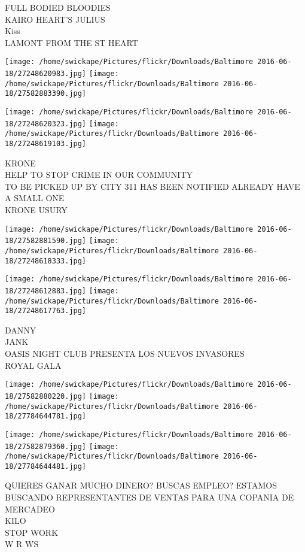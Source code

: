 \documentclass[10pt,letterpaper]{article}
\begin{document}
FULL BODIED BLOODIES\\
KAIRO HEART'S JULIUS\\
Kiss\\
LAMONT FROM THE ST HEART\\
\pagebreak

\texttt{[image: /home/swickape/Pictures/flickr/Downloads/Baltimore 2016-06-18/27248620983.jpg]}
\texttt{[image: /home/swickape/Pictures/flickr/Downloads/Baltimore 2016-06-18/27582883390.jpg]}

\texttt{[image: /home/swickape/Pictures/flickr/Downloads/Baltimore 2016-06-18/27248620323.jpg]}
\texttt{[image: /home/swickape/Pictures/flickr/Downloads/Baltimore 2016-06-18/27248619103.jpg]}

KRONE\\
HELP TO STOP CRIME IN OUR COMMUNITY\\
TO BE PICKED UP BY CITY 311 HAS BEEN NOTIFIED ALREADY HAVE A SMALL ONE\\
KRONE USURY\\
\pagebreak

\texttt{[image: /home/swickape/Pictures/flickr/Downloads/Baltimore 2016-06-18/27582881590.jpg]}
\texttt{[image: /home/swickape/Pictures/flickr/Downloads/Baltimore 2016-06-18/27248618333.jpg]}

\texttt{[image: /home/swickape/Pictures/flickr/Downloads/Baltimore 2016-06-18/27248612883.jpg]}
\texttt{[image: /home/swickape/Pictures/flickr/Downloads/Baltimore 2016-06-18/27248617763.jpg]}

DANNY\\
JANK\\
OASIS NIGHT CLUB PRESENTA LOS NUEVOS INVASORES\\
ROYAL GALA\\
\pagebreak

\texttt{[image: /home/swickape/Pictures/flickr/Downloads/Baltimore 2016-06-18/27582880220.jpg]}
\texttt{[image: /home/swickape/Pictures/flickr/Downloads/Baltimore 2016-06-18/27784644781.jpg]}

\texttt{[image: /home/swickape/Pictures/flickr/Downloads/Baltimore 2016-06-18/27582879360.jpg]}
\texttt{[image: /home/swickape/Pictures/flickr/Downloads/Baltimore 2016-06-18/27784644481.jpg]}

QUIERES GANAR MUCHO DINERO?  BUSCAS EMPLEO?  ESTAMOS BUSCANDO REPRESENTANTES DE VENTAS PARA UNA COPANIA DE MERCADEO\\
KILO\\
STOP WORK\\
W R WS\\
\pagebreak
\end{document}
